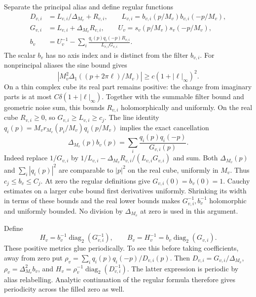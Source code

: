 \documentclass[11pt,reqno]{amsart}
\numberwithin{equation}{section}
\theoremstyle{definition}
\theoremstyle{remark}
\begin{document}
Separate the principal alias and define regular functions
\begin{align*}
 D_{v,i}&=L_{v,i}/\Delta_{M_v}+R_{v,i},\qquad
 L_{v,i}=b_{v,i}(p/M_v)b_{v,i}(-p/M_v),\\
 G_{v,i}&=L_{v,i}+\Delta_{M_v}R_{v,i},\qquad
 U_v=s_v(p/M_v)s_v(-p/M_v),\\
 b_v&=U_v^{-1}-\sum_i
             \frac{q_i(p)q_i(-p)R_{v,i}}{L_{v,i}G_{v,i}}.
\end{align*}
The scalar \(b_v\) has no axis index and is distinct from the
filter \(b_{v,i}\). For nonprincipal aliases the sine bound gives
\[
 |M_v^2\Delta_1((p+2\pi\ell)/M_v)|
                                      \ge c(1+|\ell|_\infty)^2.
\]
On a thin complex cube its real part remains positive: the change
from imaginary parts is at most \(C\delta(1+|\ell|_\infty)\).
Together with the summable filter bound and geometric noise sum,
this bounds \(R_{v,i}\) holomorphically and uniformly.
On the real cube \(R_{v,i}\ge0\), so
\(G_{v,i}\ge L_{v,i}\ge c_j\).
The line identity
\(q_i(p)=M_vr_{M_v}(p_i/M_v)q_i(p/M_v)\) implies the exact
cancellation
\begin{equation}
 \Delta_{M_v}(p)b_v(p)
                         =\sum_i\frac{q_i(p)q_i(-p)}{G_{v,i}(p)}.
 \label{eq:calibration-filled-identity}
\end{equation}
Indeed replace \(1/G_{v,i}\) by
\(1/L_{v,i}-\Delta_{M_v}R_{v,i}/(L_{v,i}G_{v,i})\)
and sum. Both \(\Delta_{M_v}(p)\) and \(\sum_i|q_i(p)|^2\)
are comparable to \(|p|^2\) on the real cube, uniformly in
\(M_v\). Thus \(c_j\le b_v\le C_j\).
At zero the regular definitions give \(G_{v,i}(0)=b_v(0)=1\).
Cauchy estimates on a larger cube bound first derivatives
uniformly. Shrinking its width in terms of these bounds and the
real lower bounds makes \(G_{v,i}^{-1},b_v^{-1}\) holomorphic
and uniformly bounded. No division by \(\Delta_{M_v}\) at zero
is used in this argument.

Define
\begin{equation}
 H_v=b_v^{-1}\operatorname{diag}_2(G_{v,i}^{-1}),\qquad
 B_v=H_v^{-1}=b_v\operatorname{diag}_2(G_{v,i}).
 \label{eq:calibration-filled-metric}
\end{equation}
These positive metrics glue periodically. To see this before
taking coefficients, away from zero put
\(\rho_v=\sum_iq_i(p)q_i(-p)/D_{v,i}(p)\).
Then \(D_{v,i}=G_{v,i}/\Delta_{M_v}\),
\(\rho_v=\Delta_{M_v}^2b_v\), and
\(H_v=\rho_v^{-1}\operatorname{diag}_2(D_{v,i}^{-1})\).
The latter expression is periodic by alias relabelling.
Analytic continuation of the regular formula therefore gives
periodicity across the filled zero as well.
\end{document}

